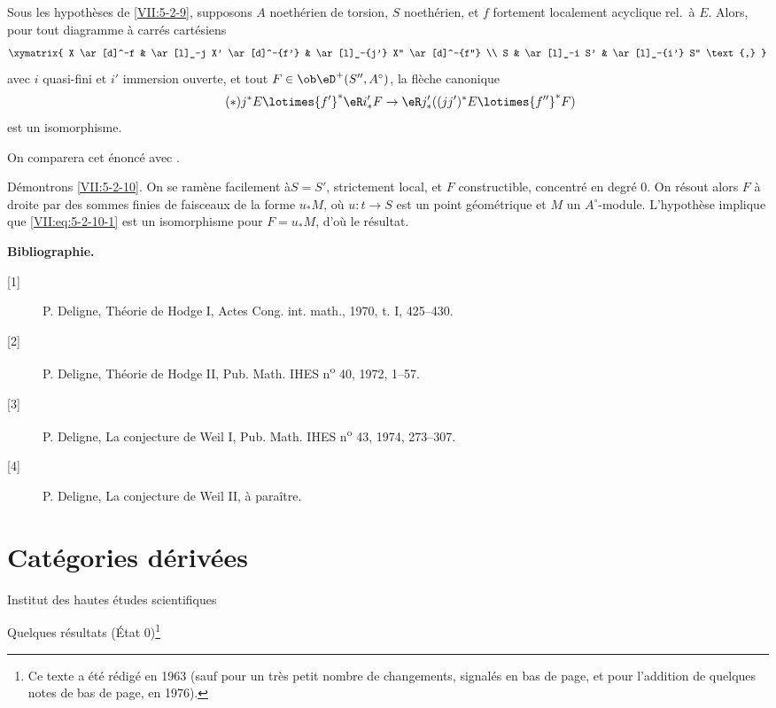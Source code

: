 \begin{proposition}\label{VII:5-2-10}
Sous les hypothèses de \ref{VII:5-2-9}, supposons $A$ noethérien de 
torsion, $S$ noethérien, et $f$ fortement localement acyclique rel.\ à $E$. 
Alors, pour tout diagramme à carrés cartésiens 
\[\xymatrix{
  X \ar[d]^-f 
    & \ar[l]_-j X' \ar[d]^-{f'} 
    & \ar[l]_-{j'} X'' \ar[d]^-{f''} \\
  S 
    & \ar[l]_-i S' 
    & \ar[l]_-{i'} S'' \text{,} 
}\]
avec $i$ quasi-fini et $i'$ immersion ouverte, et tout 
$F\in\ob\eD^+(S'',A^\circ)$, la flèche canonique 
\begin{equation*}\tag{$*$}\label{VII:eq:5-2-10-1}
  j^\ast E \lotimes {f'}^\ast \eR i_\ast' F \to \eR j_\ast' ((j j')^\ast E\lotimes {f''}^\ast F) 
\end{equation*}
est un isomorphisme. 
\end{proposition}

On comparera cet énoncé avec . 

Démontrons \ref{VII:5-2-10}. On se ramène facilement à$S=S'$, 
strictement local, et $F$ constructible, concentré en degré $0$. On 
résout alors $F$ à droite par des sommes finies de faisceaux de la forme 
$u_\ast M$, où $u:t\to S$ est un point géométrique et $M$ un 
$A^\circ$-module. L'hypothèse implique que \eqref{VII:eq:5-2-10-1} est un 
isomorphisme pour $F=u_\ast M$, d'où le résultat. 





\begin{center}\textbf{Bibliographie.}\end{center}
\begin{description}
\item[{[1]}] P. Deligne, Théorie de Hodge I, Actes Cong. int. math., 1970, t. I, 425--430.
\item[{[2]}] P. Deligne, Théorie de Hodge II, Pub. Math. IHES n\textsuperscript{o} 40, 1972, 1--57.
\item[{[3]}] P. Deligne, La conjecture de Weil I, Pub. Math. IHES n\textsuperscript{o} 43, 1974, 273--307.
\item[{[4]}] P. Deligne, La conjecture de Weil II, à paraître.
\end{description}


\chapter{Catégories dérivées}\label{VIII}
\begin{center}Institut des hautes études scientifiques\end{center}
Quelques résultats (État 0)\footnote{Ce texte a été rédigé en 1963 (sauf pour un très petit nombre de changements, signalés en bas de page, et pour l'addition de quelques notes de bas de page, en 1976).}










